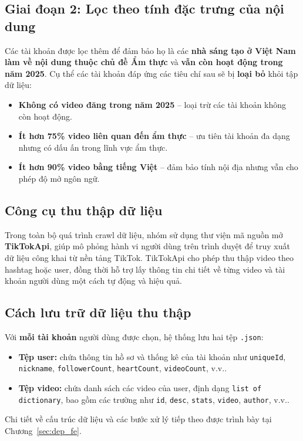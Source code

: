 \subsection*{Giai đoạn 2: Lọc theo tính đặc trưng của nội dung}

Các tài khoản được lọc thêm để đảm bảo họ là các \textbf{nhà sáng tạo ở Việt Nam làm về nội dung thuộc chủ đề Ẩm thực} và \textbf{vẫn còn hoạt động trong năm 2025}. Cụ thể các tài khoản đáp ứng các tiêu chí sau sẽ bị \textbf{loại bỏ} khỏi tập dữ liệu:
\begin{itemize}
  \item \textbf{Không có video đăng trong năm 2025} – loại trừ các tài khoản không còn hoạt động.
  \item \textbf{Ít hơn 75\% video liên quan đến ẩm thực} – ưu tiên tài khoản đa dạng nhưng có dấu ấn trong lĩnh vực ẩm thực.
  \item \textbf{Ít hơn 90\% video bằng tiếng Việt} – đảm bảo tính nội địa nhưng vẫn cho phép độ mở ngôn ngữ.
\end{itemize}

\subsection*{Công cụ thu thập dữ liệu}

Trong toàn bộ quá trình crawl dữ liệu, nhóm sử dụng thư viện mã nguồn mở \textbf{TikTokApi}, giúp mô phỏng hành vi người dùng trên trình duyệt để truy xuất dữ liệu công khai từ nền tảng TikTok. TikTokApi cho phép thu thập video theo hashtag hoặc user, đồng thời hỗ trợ lấy thông tin chi tiết về từng video và tài khoản người dùng một cách tự động và hiệu quả.

\subsection*{Cách lưu trữ dữ liệu thu thập}

Với \textbf{mỗi tài khoản} người dùng được chọn, hệ thống lưu hai tệp \texttt{.json}:
\begin{itemize}
  \item \textbf{Tệp user:} chứa thông tin hồ sơ và thống kê của tài khoản như \texttt{uniqueId}, \texttt{nickname}, \texttt{followerCount}, \texttt{heartCount}, \texttt{videoCount}, v.v..
  \item \textbf{Tệp video:} chứa danh sách các video của user, định dạng \texttt{list of dictionary}, bao gồm các trường như \texttt{id}, \texttt{desc}, \texttt{stats}, \texttt{video}, \texttt{author}, v.v..
\end{itemize}

Chi tiết về cấu trúc dữ liệu và các bước xử lý tiếp theo được trình bày tại Chương~\ref{sec:dep_fe}.
